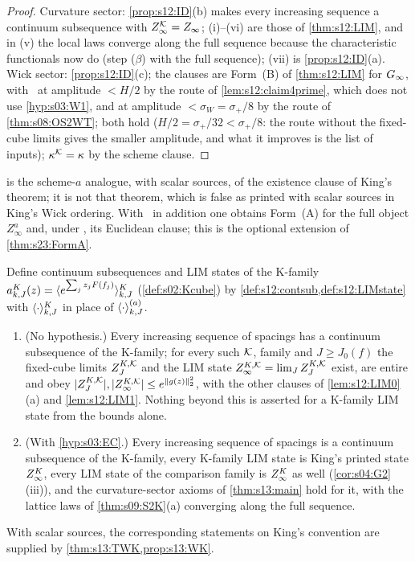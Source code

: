 \begin{proof}
Curvature sector: \cref{prop:s12:ID}(b) makes every increasing sequence a continuum subsequence with $Z^{\mathcal K}_{\infty}=Z_\infty$; (i)--(vi) are those of \cref{thm:s12:LIM}, and in (v) the local laws converge along the full sequence because the characteristic functionals now do (step ($\beta$) with the full sequence); (vii) is \cref{prop:s12:ID}(a). Wick sector: \cref{prop:s12:ID}(c); the clauses are Form~(B) of \cref{thm:s12:LIM} for $G_\infty$, with \OSt\ at amplitude $<H/2$ by the route of \cref{lem:s12:claim4prime}, which does not use \cref{hyp:s03:W1}, and at amplitude $<\sigma_W=\sigma_+/8$ by the route of \cref{thm:s08:OS2WT}; both hold ($H/2=\sigma_+/32<\sigma_+/8$: the route without the fixed-cube limits gives the smaller amplitude, and what it improves is the list of inputs); $\kappa^{\mathcal K}=\kappa$ by the scheme clause.
\end{proof}

 is the scheme-$a$ analogue, with scalar sources, of the existence clause of King's theorem; it is not that theorem, which is false as printed with scalar sources in King's Wick ordering. With \Wtwo\ in addition one obtains Form~(A) for the full object $Z^a_\infty$ and, under \RW, its Euclidean clause; this is the optional extension of \cref{thm:s23:FormA}.

\begin{corollary}\label{cor:s12:KK}
Define continuum subsequences and LIM states of the K-family $a^K_{k,J}(z)=\langle e^{\sum_jz_jF(f_j)}\rangle^{K}_{k,J}$ (\cref{def:s02:Kcube}) by \cref{def:s12:contsub,def:s12:LIMstate} with $\langle \cdot\rangle^{K}_{k,J}$ in place of $\langle \cdot\rangle^{(a)}_{k,J}$.
\begin{enumerate}[label=\textup{(\alph*)},leftmargin=*,nosep]
\item \textup{(No hypothesis.)} Every increasing sequence of spacings has a continuum subsequence of the K-family; for every such $\mathcal K$, family and $J\ge J_0(f)$ the fixed-cube limits $Z^{K,\mathcal K}_J$ and the LIM state $Z^{K,\mathcal K}_\infty=\lim_JZ^{K,\mathcal K}_J$ exist, are entire and obey $|Z^{K,\mathcal K}_J|,|Z^{K,\mathcal K}_\infty|\le e^{\lVert g(z)\rVert_2^2}$, with the other clauses of \cref{lem:s12:LIM0}(a) and \cref{lem:s12:LIM1}. Nothing beyond this is asserted for a K-family LIM state from the bounds alone.
\item \textup{(With \cref{hyp:s03:EC}.)} Every increasing sequence of spacings is a continuum subsequence of the K-family, every K-family LIM state is King's printed state $Z^{K}_{\infty}$, every LIM state of the comparison family is $Z^{K}_{\infty}$ as well (\cref{cor:s04:G2}(iii)), and the curvature-sector axioms of \cref{thm:s13:main} hold for it, with the lattice laws of \cref{thm:s09:S2K}(a) converging along the full sequence.
\end{enumerate}
With scalar sources, the corresponding statements on King's convention are supplied by \cref{thm:s13:TWK,prop:s13:WK}.
\end{corollary}

